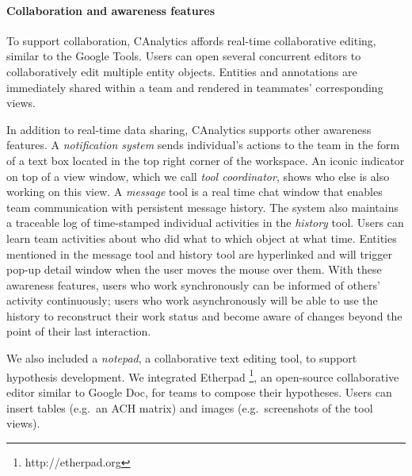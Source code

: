 \paragraph{Collaboration and awareness features}

To support collaboration, CAnalytics affords real-time collaborative editing, similar to the
Google Tools. Users can open several concurrent editors to
collaboratively edit multiple entity objects. Entities and annotations are immediately
shared within a team and rendered in teammates' corresponding views. 

In addition to real-time data sharing, CAnalytics supports other awareness features. A \emph{notification system} sends
individual's actions to the team in the form of a text box located in the top
right corner of the workspace. An iconic
indicator on top of a view window, which we call \emph{tool coordinator}, shows who else is also working on this view. A \emph{message} tool is a real time chat window that enables team
communication with persistent message history. The system also maintains
a traceable log of time-stamped individual activities in the \emph{history} tool.
Users can learn team activities about who did what to which object at
what time. Entities mentioned in the message tool and
history tool are hyperlinked and will trigger pop-up detail window when
the user moves the mouse over them. With these awareness features, users who work
synchronously can be informed of others' activity continuously; users
who work asynchronously will be able to use the history to reconstruct
their work status and become aware of changes beyond the point of their
last interaction.

We also included a \emph{notepad}, a collaborative text editing tool, to support hypothesis
development. We integrated Etherpad \footnote{http://etherpad.org}, an
open-source collaborative editor similar to Google Doc, for teams to
compose their hypotheses. Users can insert tables (e.g.~an ACH matrix)
and images (e.g.~screenshots of the tool views).
